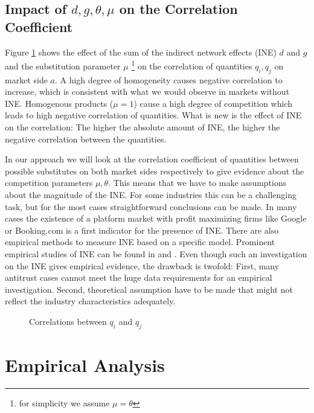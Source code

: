\documentclass[10pt,a4paper]{scrreprt}
\begin{document}
\section{Impact of $d, g, \theta, \mu$ on the Correlation Coefficient}
Figure \ref{QQ} shows the effect of the sum of the indirect network effects (INE) $d$ and $g$ and the substitution parameter $\mu$ \footnote{for simplicity we assume $\mu=\theta$ } on the correlation of quantities $q_i,q_j$ on market side $a$.  A high degree of homogeneity causes negative correlation to increase, which is consistent with what we would observe in markets without INE. Homogenous products ($\mu=1$) cause a high degree of competition which leads to high negative correlation of quantities. What is new is the effect of INE on the correlation: The higher the absolute amount of INE, the higher the negative correlation between the quantities. 

In our approach we will look at the correlation coefficient of quantities between possible substitutes on both market sides respectively to give evidence about the competition parameters $\mu, \theta$. This means that we have to make assumptions about the magnitude of the INE. For some industries this can be a challenging task, but for the most cases straightforward conclusions can be made. In many cases the existence of a platform market with profit maximizing firms like Google or Booking.com is a first indicator for the presence of INE. There are also empirical methods to measure INE based on a specific model. Prominent empirical studies of INE can be found in \cite{kaiser_price_2006} and \cite{filistrucchi_assessing_2012}. Even though such an investigation on the INE gives empirical evidence, the drawback is twofold: First, many antitrust cases cannot meet the huge data requirements for an empirical investigation. Second, theoretical assumption have to be made that might not reflect the industry characteristics adequately. 

 \begin{figure}[H]
	\centering
	\newlength\figureheight 
	\newlength\figurewidth 
	\setlength\figureheight{11cm} 
	\setlength\figurewidth{13cm}
	
	\caption{Correlations between $q_i$ and $q_j$}
	\label{QQ}
\end{figure}

\chapter{Empirical Analysis}\label{empirical}
\end{document}
